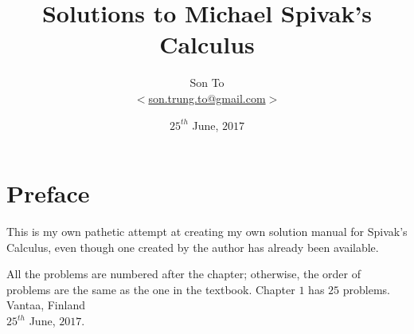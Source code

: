 \documentclass[a4paper,11pt]{memoir}
\newcommand{\note}[1]{\emph{#1}}
\theoremstyle{plain} \newtheorem{id}{Lemma}[chapter]
\theoremstyle{definition} \newtheorem{pr}{Problem}[chapter]
\theoremstyle{remark}\newtheorem{ab}{Remark}[chapter]
\begin{document}
  \title{Solutions to Michael Spivak's Calculus}
  \author{Son To\\
  $<$\href{mailto:son.trung.to@gmail.com}%
  {son.trung.to@gmail.com}$>$}
  \date{$25^{th}$ June, $2017$}

  \maketitle
  \makeatletter
  \def\cleardoublepage{\clearpage\if@twoside
  \ifodd\c@page\else
    \hbox{}
    \vspace*{\fill}
    \begin{center}
      \doublenote
    \end{center}
    \vspace*{\fill}
    \thispagestyle{empty}
    \newpage
    \if@twocolumn\hbox{}\newpage\fi\fi\fi
}
\newcommand{\mylabel}[2]{#2\def\@currentlabel{#2}\label{#1}}
\def\@endpart{\vfill\newpage
              \if@twoside
                \if@openright
                  \null
                  \thispagestyle{empty}%
\vspace*{\fill}%
\begin{quote}%
  \partnote
\end{quote}%
\vspace*{\fill}%
                  \newpage
                \fi
              \fi
              \if@tempswa
                \twocolumn
              \fi
}
\newcommand{\partnote}{}
\newcommand{\doublenote}{}

\newcommand\binomialCoefficient[2]{%
  \c@pgf@counta=#1 %
  \c@pgf@countb=#2 %
  \c@pgf@countc=\c@pgf@counta%
  \advance \c@pgf@countc by-\c@pgf@countb%
  \ifnum\c@pgf@countb>\c@pgf@countc%
    \c@pgf@countb=\c@pgf@countc%
  \fi%
  \c@pgf@countc=1 %
  \c@pgf@countd=0 %
  \pgfmathloop %
    \ifnum\c@pgf@countd<\c@pgf@countb%
    \multiply \c@pgf@countc by\c@pgf@counta%
    \advance  \c@pgf@counta by-1%
    \advance  \c@pgf@countd by1%
    \divide   \c@pgf@countc by\c@pgf@countd%
  \repeatpgfmathloop%
  \the\c@pgf@countc%
}
\makeatother

\renewcommand{\doublenote}{%
\note{On maailmalle}}
\frontmatter
  \chapter{Preface}
    This is my own pathetic attempt at creating my own solution manual for
    Spivak's Calculus, even though one created by the author has already been
    available.
    \par
    All the problems are numbered after the chapter;
    otherwise, the order of problems are the same as
    the one in the textbook.
    Chapter $1$ has $25$ problems.
    \flushright
    Vantaa, Finland \\
    $25^{th}$ June, $2017$.
  \clearpage
  \tableofcontents
\end{document}
